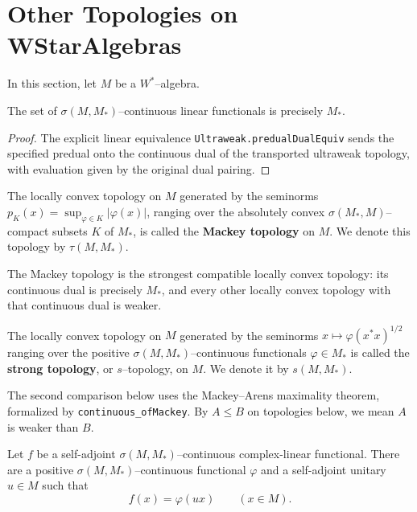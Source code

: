 \section{Other Topologies on WStarAlgebras}

In this section, let $M$ be a $W^{*}$--algebra.

\begin{proposition}
  \label{prop:loc_cvx_result}
  \leanok
  The set of $\sigma(M,M_{*})$--continuous linear functionals is precisely $M_{*}$.
\end{proposition}

\begin{proof}
  \leanok
  The explicit linear equivalence \texttt{Ultraweak.predualDualEquiv} sends the specified predual
  onto the continuous dual of the transported ultraweak topology, with evaluation given by the
  original dual pairing.
\end{proof}

\begin{definition}
  \label{def:Mackey_top}
  \leanok
  The locally convex topology on $M$ generated by the seminorms $p_{K}(x)=\sup_{\varphi\in K}|\varphi(x)|$, ranging over
  the absolutely convex $\sigma(M_{*},M)$--compact subsets $K$ of $M_{*}$, is called the \textbf{Mackey topology} on $M$.
  We denote this topology by $\tau(M,M_{*})$.
\end{definition}

The Mackey topology is the strongest compatible locally convex topology: its continuous dual is
precisely $M_{*}$, and every other locally convex topology with that continuous dual is weaker.

\begin{definition}
  \label{def:strong_top}
  \leanok
  The locally convex topology on $M$ generated by the seminorms $x\mapsto \varphi(x^{*}x)^{1/2}$
  ranging over the positive $\sigma(M,M_{*})$--continuous functionals $\varphi\in M_{*}$ is
  called the \textbf{strong topology}, or $s$--topology, on $M$. We denote it by $s(M,M_{*})$.
\end{definition}

The second comparison below uses the Mackey--Arens maximality theorem, formalized by
\texttt{continuous\_ofMackey}.
By $A\le B$ on topologies below, we mean $A$ is weaker than $B$.

\begin{theorem}
  \label{thm:polar_decomposition_ultraweak_functional}
  \leanok
  Let $f$ be a self-adjoint $\sigma(M,M_{*})$--continuous complex-linear functional. There are a
  positive $\sigma(M,M_{*})$--continuous functional $\varphi$ and a self-adjoint unitary $u\in M$
  such that
  \[
    f(x)=\varphi(ux) \qquad (x\in M).
  \]
\end{theorem}


